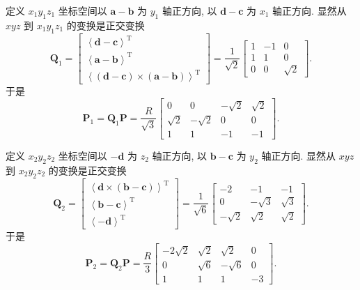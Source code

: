 \documentclass{article}
\begin{document}
定义 $x_1y_1z_1$ 坐标空间以 $\mathbf a-\mathbf b$ 为 $y_1$ 轴正方向, 以 $\mathbf d-\mathbf c$ 为 $x_1$ 轴正方向.
显然从 $xyz$ 到 $x_1y_1z_1$ 的变换是正交变换
\begin{equation}
	\mathbf Q_1=\left[\begin{matrix}
		\left<\mathbf d-\mathbf c\right>^\mathrm T \\
		\left<\mathbf a-\mathbf b\right>^\mathrm T \\
		\left<\left(\mathbf d-\mathbf c\right)\times\left(\mathbf a-\mathbf b\right)\right>^\mathrm T
	\end{matrix}\right]=\frac1{\sqrt2}\left[\begin{matrix}
		1 & -1 & 0 \\ 1 & 1 & 0 \\ 0 & 0 & \sqrt2
	\end{matrix}\right].
\end{equation}
于是
\begin{equation}
	\mathbf P_1=\mathbf Q_1\mathbf P=\frac R{\sqrt3}\left[\begin{matrix}
		0 & 0 & -\sqrt2 & \sqrt2 \\ \sqrt2 & -\sqrt2 & 0 & 0 \\ 1 & 1 & -1 & -1
	\end{matrix}\right].
\end{equation}

定义 $x_2y_2z_2$ 坐标空间以 $-\mathbf d$ 为 $z_2$ 轴正方向, 以 $\mathbf b-\mathbf c$ 为 $y_2$ 轴正方向.
显然从 $xyz$ 到 $x_2y_2z_2$ 的变换是正交变换
\begin{equation}
	\mathbf Q_2=\left[\begin{matrix}
		\left<\mathbf d\times\left(\mathbf b-\mathbf c\right)\right>^\mathrm T \\
		\left<\mathbf b-\mathbf c\right>^\mathrm T \\
		\left<-\mathbf d\right>^\mathrm T
	\end{matrix}\right]=\frac1{\sqrt6}\left[\begin{matrix}
		-2 & -1 & -1 \\ 0 & -\sqrt3 & \sqrt3 \\ -\sqrt2 & \sqrt2 & \sqrt2
	\end{matrix}\right].
\end{equation}
于是
\begin{equation}
	\mathbf P_2=\mathbf Q_2\mathbf P=\frac R3\left[\begin{matrix}
		-2\sqrt2 & \sqrt2 & \sqrt2 & 0 \\ 0 & \sqrt6 & -\sqrt6 & 0 \\ 1 & 1 & 1 & -3
	\end{matrix}\right].
\end{equation}
\end{document}

